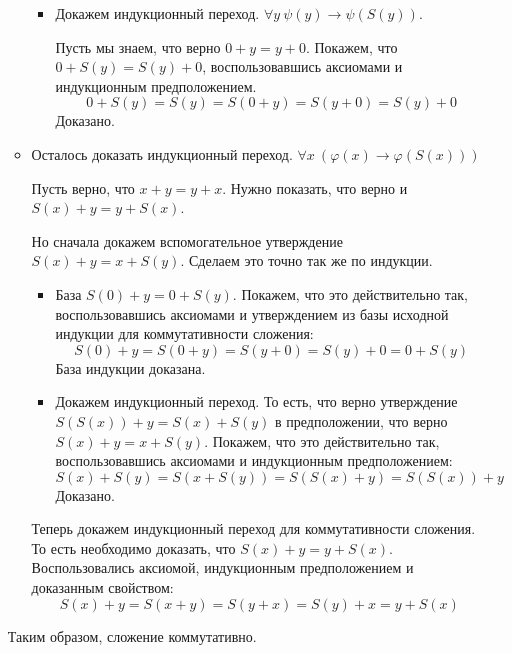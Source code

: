 \begin{enumerate}
\begin{itemize}
\begin{itemize}
		\item Докажем индукционный переход. $\forall y \ \psi(y) \to \psi(S(y))$.
		
		Пусть мы знаем, что верно $0 + y = y + 0$. Покажем, что $0 + S(y) = S(y) + 0$, воспользовавшись аксиомами 
		и индукционным предположением.
		\begin{equation*}
		0 + S(y) = S(y) = S(0 + y) = S(y + 0) = S(y) + 0
		\end{equation*}
		Доказано.
	\end{itemize}

	\item Осталось доказать индукционный переход. $\forall x \ (\varphi(x) \to \varphi(S(x)))$
	
	Пусть верно, что $x + y = y + x$. Нужно показать, что верно и $S(x) + y = y + S(x)$.
	
	Но сначала докажем вспомогательное утверждение $S(x) + y = x + S(y)$. Сделаем это точно так же по индукции.
	\begin{itemize}
		\item База $S(0) + y = 0 + S(y)$. Покажем, что это действительно так, воспользовавшись аксиомами и 
		утверждением из базы исходной индукции для коммутативности сложения:
		\begin{equation*}
			S(0) + y = S(0 + y) = S(y + 0) = S(y) + 0 = 0 + S(y)
		\end{equation*}
		База индукции доказана.
		\item Докажем индукционный переход. То есть, что верно утверждение $S(S(x)) + y = S(x) + S(y)$ в 
		предположении, что верно $S(x) + y = x + S(y)$. Покажем, что это действительно так, воспользовавшись 
		аксиомами и индукционным предположением:
		\begin{equation*}
			S(x) + S(y) = S(x + S(y)) = S(S(x) + y) = S(S(x)) + y
		\end{equation*}
		Доказано.
	\end{itemize}
	Теперь докажем индукционный переход для коммутативности сложения. То есть необходимо доказать, что $S(x) + y 
	= y + S(x)$. Воспользовались аксиомой, индукционным предположением и доказанным свойством:
	\begin{equation*}
		S(x) + y = S(x + y) = S(y + x) = S(y) + x = y + S(x)
 	\end{equation*}
\end{itemize}
Таким образом, сложение коммутативно.

\end{enumerate}

